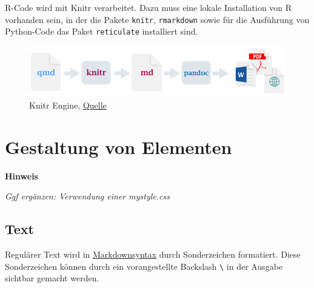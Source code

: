 \documentclass[
  letterpaper,
  DIV=11]{scrartcl}
\begin{document}
R-Code wird mit Knitr verarbeitet. Dazu muss eine lokale Installation
von R vorhanden sein, in der die Pakete \texttt{knitr},
\texttt{rmarkdown} sowie für die Ausführung von Python-Code das Paket
\texttt{reticulate} installiert sind.

\begin{figure}[H]

{\centering \includegraphics{grafiken/Renderpfad_Knitr.png}

}

\caption{Knitr Engine,
\href{https://quarto.org/docs/get-started/hello/rstudio.html\#how-it-works}{Quelle}}

\end{figure}%

\section{Gestaltung von Elementen}\label{sec-Elemente}

\begin{tcolorbox}[enhanced jigsaw, breakable, rightrule=.15mm, leftrule=.75mm, opacityback=0, colframe=quarto-callout-warning-color-frame, toprule=.15mm, left=2mm, colback=white, arc=.35mm, bottomrule=.15mm]
\begin{minipage}[t]{5.5mm}
\textcolor{quarto-callout-warning-color}{\faExclamationTriangle}
\end{minipage}%
\begin{minipage}[t]{\textwidth - 5.5mm}

\vspace{-3mm}\textbf{Hinweis}\vspace{3mm}

\emph{Ggf ergänzen: Verwendung einer mystyle.css}

\end{minipage}%
\end{tcolorbox}

\subsection{Text}\label{text}

Regulärer Text wird in
\href{https://quarto.org/docs/authoring/markdown-basics.html\#overview}{Markdownsyntax}
durch Sonderzeichen formatiert. Diese Sonderzeichen können durch ein
vorangestellte Backslash \texttt{\textbackslash{}} in der Ausgabe
sichtbar gemacht werden.
\end{document}

